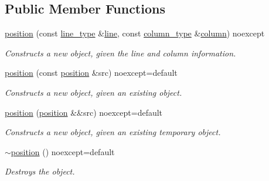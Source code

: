 \subsection*{Public Member Functions}
\begin{DoxyCompactItemize}
\item 
\hyperlink{classbfjit_1_1position_a4e33b31f04bc22264a0e11e53658b823}{position} (const \hyperlink{classbfjit_1_1position_a6319989e5821e4a159ed1870e8ba656e}{line\+\_\+type} \&\hyperlink{classbfjit_1_1position_a97065ff829263ae30ee20789d2a4d08f}{line}, const \hyperlink{classbfjit_1_1position_a472af3de5d41775deff6293c0ab6450b}{column\+\_\+type} \&\hyperlink{classbfjit_1_1position_ad6bc7ed8fea430bbd3932c213cd86786}{column}) noexcept
\begin{DoxyCompactList}\small\item\em Constructs a new object, given the line and column information. \end{DoxyCompactList}\item 
\hypertarget{classbfjit_1_1position_ab8678e29129d57b4a3f562e1f0b12d01}{}\label{classbfjit_1_1position_ab8678e29129d57b4a3f562e1f0b12d01} 
\hyperlink{classbfjit_1_1position_ab8678e29129d57b4a3f562e1f0b12d01}{position} (const \hyperlink{classbfjit_1_1position}{position} \&src) noexcept=default
\begin{DoxyCompactList}\small\item\em Constructs a new object, given an existing object. \end{DoxyCompactList}\item 
\hypertarget{classbfjit_1_1position_a49cf6faea19cdf8341bbe2321f283352}{}\label{classbfjit_1_1position_a49cf6faea19cdf8341bbe2321f283352} 
\hyperlink{classbfjit_1_1position_a49cf6faea19cdf8341bbe2321f283352}{position} (\hyperlink{classbfjit_1_1position}{position} \&\&src) noexcept=default
\begin{DoxyCompactList}\small\item\em Constructs a new object, given an existing temporary object. \end{DoxyCompactList}\item 
\hypertarget{classbfjit_1_1position_ad9099933119dc51c1254de3bb114baa5}{}\label{classbfjit_1_1position_ad9099933119dc51c1254de3bb114baa5} 
\hyperlink{classbfjit_1_1position_ad9099933119dc51c1254de3bb114baa5}{$\sim$position} () noexcept=default
\begin{DoxyCompactList}\small\item\em Destroys the object. \end{DoxyCompactList}\item 

\end{DoxyCompactItemize}
